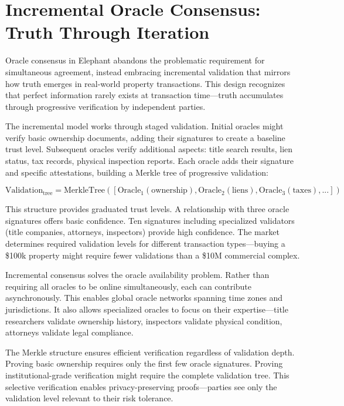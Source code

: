 \section{Incremental Oracle Consensus: Truth Through Iteration}

Oracle consensus in Elephant abandons the problematic requirement for simultaneous agreement, instead embracing incremental validation that mirrors how truth emerges in real-world property transactions. This design recognizes that perfect information rarely exists at transaction time—truth accumulates through progressive verification by independent parties.

The incremental model works through staged validation. Initial oracles might verify basic ownership documents, adding their signatures to create a baseline trust level. Subsequent oracles verify additional aspects: title search results, lien status, tax records, physical inspection reports. Each oracle adds their signature and specific attestations, building a Merkle tree of progressive validation:

\[
\text{Validation}_{\text{tree}} = \text{MerkleTree}([\text{Oracle}_1(\text{ownership}), \text{Oracle}_2(\text{liens}), \text{Oracle}_3(\text{taxes}), ...])
\]

This structure provides graduated trust levels. A relationship with three oracle signatures offers basic confidence. Ten signatures including specialized validators (title companies, attorneys, inspectors) provide high confidence. The market determines required validation levels for different transaction types—buying a \$100k property might require fewer validations than a \$10M commercial complex.

Incremental consensus solves the oracle availability problem. Rather than requiring all oracles to be online simultaneously, each can contribute asynchronously. This enables global oracle networks spanning time zones and jurisdictions. It also allows specialized oracles to focus on their expertise—title researchers validate ownership history, inspectors validate physical condition, attorneys validate legal compliance.

The Merkle structure ensures efficient verification regardless of validation depth. Proving basic ownership requires only the first few oracle signatures. Proving institutional-grade verification might require the complete validation tree. This selective verification enables privacy-preserving proofs—parties see only the validation level relevant to their risk tolerance.

